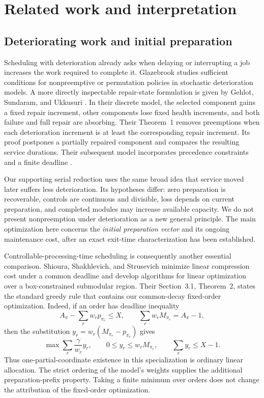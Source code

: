 \section{Related work and interpretation}
\label{sec:related}

\subsection{Deteriorating work and initial preparation}

Scheduling with deterioration already asks when delaying or interrupting a
job increases the work required to complete it. Glazebrook
\cite{Glazebrook1992,Glazebrook1993} studies sufficient conditions for
nonpreemptive or permutation policies in stochastic deterioration models.
A more directly inspectable repair-state formulation is given by Gehlot,
Sundaram, and Ukkusuri \cite{GehlotSundaramUkkusuri2020}. In their discrete
model, the selected component gains a fixed repair increment, other components
lose fixed health increments, and both failure and full repair are absorbing.
Their Theorem~1 removes preemptions when each deterioration increment is at
least the corresponding repair increment. Its proof postpones a partially
repaired component and compares the resulting service durations. Their
subsequent model incorporates precedence constraints and a finite deadline
\cite{GehlotSundaramUkkusuri2020Interdependent}.

Our supporting serial reduction uses the same broad idea that service moved
later suffers less deterioration. Its hypotheses differ: zero preparation is
recoverable, controls are continuous and divisible, loss depends on current
preparation, and completed modules may increase available capacity. We do not
present nonpreemption under deterioration as a new general principle. The
main optimization here concerns the \emph{initial preparation vector} and its
ongoing maintenance cost, after an exact exit-time characterization has been
established.

Controllable-processing-time scheduling is consequently another essential
comparison. Shioura, Shakhlevich, and Strusevich
\cite{ShiouraShakhlevichStrusevich2015} minimize linear compression cost under
a common deadline and develop algorithms for linear optimization over a
box-constrained submodular region. Their Section~3.1, Theorem~2, states the
standard greedy rule that contains our common-decay fixed-order optimization.
Indeed, if an order has deadline inequality
\[
 A_\pi-\sum_r w_r p_{\pi_r}\leq X,
 \qquad \sum_r w_rM_{\pi_r}=A_\pi-1,
\]
then the substitution $y_r=w_r(M_{\pi_r}-p_{\pi_r})$ gives
\[
 \max\sum_r\frac{\gamma}{w_r}y_r,
 \qquad 0\leq y_r\leq w_rM_{\pi_r},
 \qquad \sum_r y_r\leq X-1.
\]
Thus one-partial-coordinate existence in this specialization is ordinary
linear allocation. The strict ordering of the model's weights supplies the
additional preparation-prefix property. Taking a finite minimum over orders
does not change the attribution of the fixed-order optimization.

